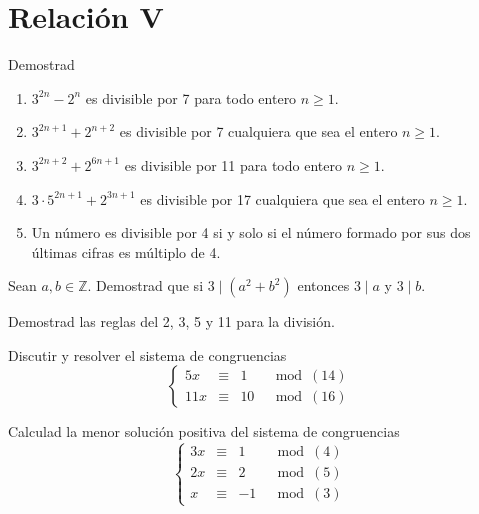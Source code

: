 \section{Relación V}
\begin{ejercicio}
    Demostrad
    \begin{enumerate}
        \item $3^{2n}-2^n$ es divisible por 7 para todo entero $n\geq 1$.
        \item $3^{2n+1} + 2^{n+2}$ es divisible por 7 cualquiera que sea el entero $n\geq 1$.
        \item $3^{2n+2}+2^{6n+1}$ es divisible por 11 para todo entero $n\geq 1$.
        \item $3\cdot 5^{2n+1}+2^{3n+1}$ es divisible por 17 cualquiera que sea el entero $n\geq 1$.
        \item Un número es divisible por 4 si y solo si el número formado por sus dos últimas cifras es múltiplo de 4.
    \end{enumerate}
\end{ejercicio}

\begin{ejercicio}
    Sean $a,b\in \mathbb{Z}$. Demostrad que si $3\mid (a^2 + b^2)$ entonces $3\mid a$ y $3\mid b$.
\end{ejercicio}

\begin{ejercicio}
    Demostrad las reglas del 2, 3, 5 y 11 para la división.
\end{ejercicio}

\begin{ejercicio}
    Discutir y resolver el sistema de congruencias
    \begin{equation*}
        \left\{\begin{array}{cccc}
                5x & \equiv & 1 & \mod (14) \\
                11x & \equiv & 10 & \mod(16)
        \end{array}\right.
    \end{equation*}
\end{ejercicio}

\begin{ejercicio}
    Calculad la menor solución positiva del sistema de congruencias
    \begin{equation*}
        \left\{\begin{array}{cccc}
                3x & \equiv & 1 & \mod (4) \\
                2x & \equiv & 2 & \mod(5) \\
                x & \equiv & -1 & \mod(3)
        \end{array}\right.
    \end{equation*}
\end{ejercicio}

